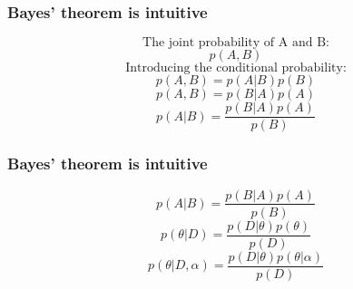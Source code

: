 \documentclass{beamer}
\begin{document}
\begin{frame}[t]
  \frametitle{Bayes' theorem is intuitive}
  \begin{minipage}{0\linewidth}
\begin{flushleft}
\begin{equation*}
  \mbox{The joint probability of A and B:}
\end{equation*}
\begin{equation*}
  p(A,B)
\end{equation*}
\pause
\begin{equation*}
  \mbox{Introducing the conditional probability:}
\end{equation*}
\begin{equation*}
  p(A,B) = p(A|B) p(B)
\end{equation*}
\pause
\begin{equation*}
  p(A,B) = p(B|A) p(A)
\end{equation*}
\pause
\begin{equation*}
  p(A|B) = \frac{p(B|A) p(A)}{p(B)}
\end{equation*}
\end{flushleft} 
\end{minipage}
\end{frame}

\begin{frame}[t]
  \frametitle{Bayes' theorem is intuitive}
  \begin{minipage}{0\linewidth}
\begin{flushleft}
\begin{equation*}
  p(A|B) = \frac{p(B|A) p(A)}{p(B)}
\end{equation*}
\pause
\begin{equation*}
  p(\theta|D) = \frac{p(D|\theta) p(\theta)}{p(D)}
\end{equation*}
\pause
\begin{equation*}
  p(\theta|D,\alpha) = \frac{p(D|\theta) p(\theta|\alpha)}{p(D)}
\end{equation*}

\end{flushleft} 
\end{minipage}
\end{frame}
\end{document}
